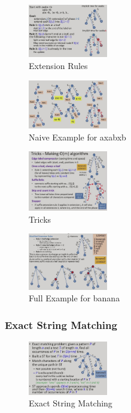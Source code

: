 \begin{figure}[H]
    \centering
    \includegraphics[width=0.309\textwidth]{pic/DAA7/Extension Rules}
    \caption{Extension Rules}
\end{figure}

\begin{figure}[H]
    \centering
    \includegraphics[width=0.309\textwidth]{pic/DAA7/Ukkonen's Algorithm exp.png}
    \caption{Naive Example for axabxb}
\end{figure}

\begin{figure}[H]
    \centering
    \includegraphics[width=0.309\textwidth]{pic/DAA7/Tricks}
    \caption{Tricks}
\end{figure}

\begin{figure}[H]
    \centering
    \includegraphics[width=0.309\textwidth]{pic/DAA7/Ukkonen's Algorithm Example2}
    \caption{Full Example for banana}
\end{figure}

\subsubsection{Exact String Matching}
\begin{figure}[H]
    \centering
    \includegraphics[width=0.309\textwidth]{pic/DAA7/Exact String Matching}
    \caption{Exact String Matching}
\end{figure}

